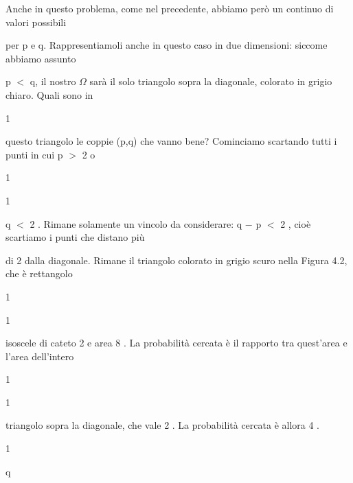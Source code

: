 \documentclass[a4paper,portrait,12pt]{article}
\begin{document}
\begin{flushleft}
Anche in questo problema, come nel precedente, abbiamo per\`{o} un continuo di valori possibili
\end{flushleft}


\begin{flushleft}
per p e q. Rappresentiamoli anche in questo caso in due dimensioni: siccome abbiamo assunto
\end{flushleft}


\begin{flushleft}
p $<$ q, il nostro $\Omega$ sar\`{a} il solo triangolo sopra la diagonale, colorato in grigio chiaro. Quali sono in
\end{flushleft}


1


\begin{flushleft}
questo triangolo le coppie (p,q) che vanno bene? Cominciamo scartando tutti i punti in cui p $>$ 2 o
\end{flushleft}


1


1


\begin{flushleft}
q $<$ 2 . Rimane solamente un vincolo da considerare: q $-$ p $<$ 2 , cio\`{e} scartiamo i punti che distano più
\end{flushleft}


\begin{flushleft}
di 2 dalla diagonale. Rimane il triangolo colorato in grigio scuro nella Figura 4.2, che \`{e} rettangolo
\end{flushleft}


1


1


\begin{flushleft}
isoscele di cateto 2 e area 8 . La probabilit\`{a} cercata \`{e} il rapporto tra quest'area e l'area dell'intero
\end{flushleft}


1


1


\begin{flushleft}
triangolo sopra la diagonale, che vale 2 . La probabilit\`{a} cercata \`{e} allora 4 .
\end{flushleft}


1





\begin{flushleft}
q
\end{flushleft}
\end{document}
